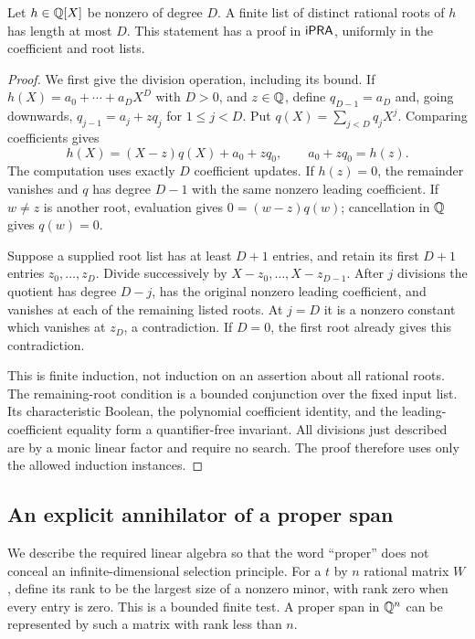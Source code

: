 \begin{lemma}
\label{lem:section-root-count}
Let $h\in\mathbb Q[X]$ be nonzero of degree $D$. A finite list of distinct
rational roots of $h$ has length at most $D$. This statement has a proof
in $\mathsf{iPRA}$, uniformly in the coefficient and root lists.
\end{lemma}
\begin{proof}
We first give the division operation, including its bound. If
$h(X)=a_0+\cdots+a_DX^D$ with $D>0$, and $z\in\mathbb Q$, define
$q_{D-1}=a_D$ and, going downwards, $q_{j-1}=a_j+zq_j$ for
$1\le j<D$. Put $q(X)=\sum_{j<D}q_jX^j$. Comparing coefficients gives
\[
 h(X)=(X-z)q(X)+a_0+zq_0,
 \qquad a_0+zq_0=h(z).
\]
The computation uses exactly $D$ coefficient updates. If $h(z)=0$,
the remainder vanishes and $q$ has degree $D-1$ with the same nonzero
leading coefficient. If $w\ne z$ is another root, evaluation gives
$0=(w-z)q(w)$; cancellation in $\mathbb Q$ gives $q(w)=0$.

Suppose a supplied root list has at least $D+1$ entries, and retain its
first $D+1$ entries $z_0,\ldots,z_D$. Divide successively by
$X-z_0,\ldots,X-z_{D-1}$. After $j$ divisions the quotient has degree
$D-j$, has the original nonzero leading coefficient, and vanishes at
each of the remaining listed roots. At $j=D$ it is a nonzero constant
which vanishes at $z_D$, a contradiction. If $D=0$, the first root
already gives this contradiction.

This is finite induction, not induction on an assertion about all
rational roots. The remaining-root condition is a bounded conjunction
over the fixed input list. Its characteristic Boolean, the polynomial
coefficient identity, and the leading-coefficient equality form a
quantifier-free invariant. All divisions just described are by a monic
linear factor and require no search. The proof therefore uses only the
allowed induction instances.
\end{proof}

\subsection{An explicit annihilator of a proper span}

We describe the required linear algebra so that the word ``proper''
does not conceal an infinite-dimensional selection principle. For a
$t$ by $n$ rational matrix $W$, define its rank to be the largest size
of a nonzero minor, with rank zero when every entry is zero. This is
a bounded finite test. A proper span in $\mathbb Q^n$ can be represented by
such a matrix with rank less than $n$.

